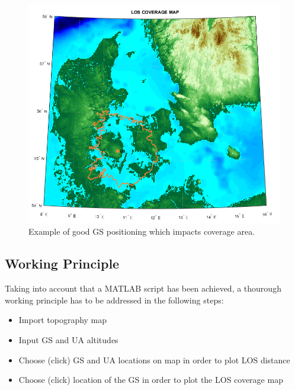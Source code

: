 \begin{figure}[H]
	\centering
	\includegraphics[scale=0.67]{figures/los_odense.png}
	\caption{Example of good GS positioning which impacts coverage area.}
   	\label{fig:los_odense}
\end{figure}

\subsection*{Working Principle}
Taking into account that a MATLAB script has been achieved, a thourough working principle has to be addressed in the following steps:
\begin{itemize}
	\item Import topography map 
	\item Input GS and UA altitudes
	\item Choose (click) GS and UA locations on map in order to plot LOS distance
	\item Choose (click) location of the GS in order to plot the LOS coverage map
\end{itemize}